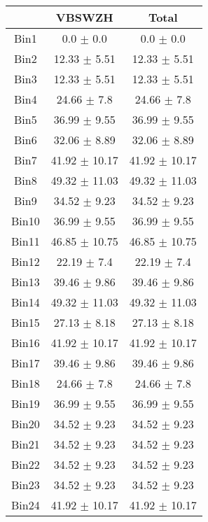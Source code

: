   \begin{tabular}{|c|c|c|}
  \hline
      & VBSWZH & Total \\ \cline{1-3} 
     \hline\hline
     Bin1 & 0.0 $\pm$ 0.0 & 0.0 $\pm$ 0.0 \\ \cline{1-3} 
     Bin2 & 12.33 $\pm$ 5.51 & 12.33 $\pm$ 5.51 \\ \cline{1-3} 
     Bin3 & 12.33 $\pm$ 5.51 & 12.33 $\pm$ 5.51 \\ \cline{1-3} 
     Bin4 & 24.66 $\pm$ 7.8 & 24.66 $\pm$ 7.8 \\ \cline{1-3} 
     Bin5 & 36.99 $\pm$ 9.55 & 36.99 $\pm$ 9.55 \\ \cline{1-3} 
     Bin6 & 32.06 $\pm$ 8.89 & 32.06 $\pm$ 8.89 \\ \cline{1-3} 
     Bin7 & 41.92 $\pm$ 10.17 & 41.92 $\pm$ 10.17 \\ \cline{1-3} 
     Bin8 & 49.32 $\pm$ 11.03 & 49.32 $\pm$ 11.03 \\ \cline{1-3} 
     Bin9 & 34.52 $\pm$ 9.23 & 34.52 $\pm$ 9.23 \\ \cline{1-3} 
     Bin10 & 36.99 $\pm$ 9.55 & 36.99 $\pm$ 9.55 \\ \cline{1-3} 
     Bin11 & 46.85 $\pm$ 10.75 & 46.85 $\pm$ 10.75 \\ \cline{1-3} 
     Bin12 & 22.19 $\pm$ 7.4 & 22.19 $\pm$ 7.4 \\ \cline{1-3} 
     Bin13 & 39.46 $\pm$ 9.86 & 39.46 $\pm$ 9.86 \\ \cline{1-3} 
     Bin14 & 49.32 $\pm$ 11.03 & 49.32 $\pm$ 11.03 \\ \cline{1-3} 
     Bin15 & 27.13 $\pm$ 8.18 & 27.13 $\pm$ 8.18 \\ \cline{1-3} 
     Bin16 & 41.92 $\pm$ 10.17 & 41.92 $\pm$ 10.17 \\ \cline{1-3} 
     Bin17 & 39.46 $\pm$ 9.86 & 39.46 $\pm$ 9.86 \\ \cline{1-3} 
     Bin18 & 24.66 $\pm$ 7.8 & 24.66 $\pm$ 7.8 \\ \cline{1-3} 
     Bin19 & 36.99 $\pm$ 9.55 & 36.99 $\pm$ 9.55 \\ \cline{1-3} 
     Bin20 & 34.52 $\pm$ 9.23 & 34.52 $\pm$ 9.23 \\ \cline{1-3} 
     Bin21 & 34.52 $\pm$ 9.23 & 34.52 $\pm$ 9.23 \\ \cline{1-3} 
     Bin22 & 34.52 $\pm$ 9.23 & 34.52 $\pm$ 9.23 \\ \cline{1-3} 
     Bin23 & 34.52 $\pm$ 9.23 & 34.52 $\pm$ 9.23 \\ \cline{1-3} 
     Bin24 & 41.92 $\pm$ 10.17 & 41.92 $\pm$ 10.17 \\ \cline{1-3} 

\end{tabular}
